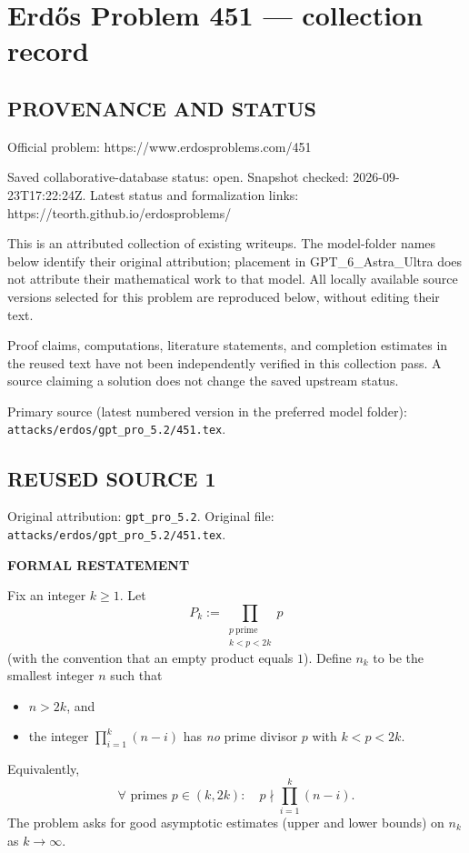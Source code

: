 \section*{Erd\H{o}s Problem 451 --- collection record}

\subsection*{PROVENANCE AND STATUS}
Official problem: https://www.erdosproblems.com/451

Saved collaborative-database status: open.
Snapshot checked: 2026-09-23T17:22:24Z.
Latest status and formalization links: https://teorth.github.io/erdosproblems/

This is an attributed collection of existing writeups. The model-folder names below identify their original attribution; placement in GPT\_6\_Astra\_Ultra does not attribute their mathematical work to that model. All locally available source versions selected for this problem are reproduced below, without editing their text.

Proof claims, computations, literature statements, and completion estimates in the reused text have not been independently verified in this collection pass. A source claiming a solution does not change the saved upstream status.

Primary source (latest numbered version in the preferred model folder): \texttt{attacks/erdos/gpt\_pro\_5.2/451.tex}.

\subsection*{REUSED SOURCE 1}
Original attribution: \texttt{gpt\_pro\_5.2}.
Original file: \texttt{attacks/erdos/gpt\_pro\_5.2/451.tex}.


\textbf{FORMAL RESTATEMENT}

Fix an integer $k\ge 1$. Let
\[
P_k:=\prod_{\substack{p\ \text{prime}\\ k<p<2k}} p
\]
(with the convention that an empty product equals $1$). Define $n_k$ to be the smallest integer $n$ such that
\begin{itemize}
\item $n>2k$, and
\item the integer $\prod_{i=1}^k (n-i)$ has \emph{no} prime divisor $p$ with $k<p<2k$.
\end{itemize}
Equivalently,
\[
\forall\text{ primes }p\in (k,2k):\quad p\nmid\prod_{i=1}^k(n-i).
\]
The problem asks for good asymptotic estimates (upper and lower bounds) on $n_k$ as $k\to\infty$.

